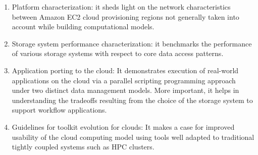 \documentclass[10pt,journal,cspaper,compsoc]{IEEEtran}
\begin{document}
\begin{enumerate}
\item Platform characterization: it sheds light on the network characteristics
    between Amazon EC2 cloud provisioning regions not generally taken into
    account while building computational models.

\item Storage system performance characterization: it benchmarks the
performance of various storage systems with respect to core data
access patterns. 

\item Application porting to the cloud: It demonstrates execution of real-world
applications on the cloud via a parallel scripting programming approach under
two distinct data management models. More important, it helps in
understanding the tradeoffs resulting from the choice of the storage
system to support workflow applications. 

\item Guidelines for toolkit evolution for clouds: It makes a case for
improved usability of the cloud computing model using tools well adapted to
traditional tightly coupled systems such as HPC clusters. 
\end{enumerate}

\usetikzlibrary{arrows,shapes,positioning,shadows,trees}
\end{document}
